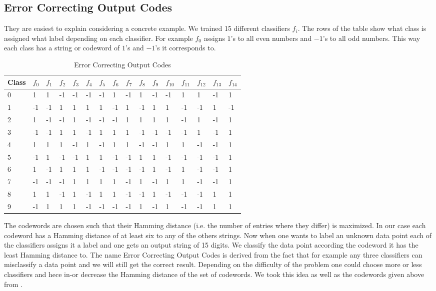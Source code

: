 \subsection{Error Correcting Output Codes}
They are easiest to explain considering a concrete example. We trained 15 different classifiers $f_i$. The rows of the table show what class is assigned what label depending on each classifier. For example $f_0$ assigns $1$'s to all even numbers and $-1$'s to all odd numbers. This way each class has a string or codeword of $1$'s and $-1$'s it corresponds to.

\begin{table}[ht!]
	\centering
	\caption{Error Correcting Output Codes}
	\label{Codewords}
	\begin{tabular}{|l|l|l|l|l|l|l|l|l|l|l|l|l|l|l|l|}
		\hline
		Class	& $f_0$ & $f_1$ & $f_2$ & $f_3$ & $f_4$ & $f_5$ & $f_6$ & $f_7$ & $f_8$ & $f_9$ & $f_{10}$ & $f_{11}$ & $f_{12}$ & $f_{13}$ & $f_{14}$ \\ \hline \hline
		0	& 1 & 1 & -1 & -1 & -1 & -1 & 1 & -1 & 1 & -1 & -1 & 1 & 1 & -1 & 1 \\ \hline
		1	& -1 & -1 & 1 & 1 & 1 & 1 & -1 & 1 & -1 & 1 & 1 & -1 & -1 & 1 & -1 \\ \hline
		2	& 1 & -1 & -1 & 1 & -1 & -1 & -1 & 1 & 1 & 1 & 1 & -1 & 1 & -1 & 1 \\ \hline
		3	& -1 & -1 & 1 & 1 & -1 & 1 & 1 & 1 & -1 & -1 & -1 & -1 & 1 & -1 & 1 \\ \hline
		4	& 1 & 1 & 1 & -1 & 1 & -1 & 1 & 1 & -1 & -1 & 1 & 1 & -1 & -1 & 1 \\ \hline
		5	& -1 & 1 & -1 & -1 & 1 & 1 & -1 & -1 & 1 & 1 & -1 & -1 & -1 & -1 & 1 \\ \hline
		6	& 1 & -1 & 1 & 1 & 1 & -1 & -1 & -1 & -1 & 1 & -1 & 1 & -1 & -1 & 1 \\ \hline
		7	& -1 & -1 & -1 & 1 & 1 & 1 & 1 & -1 & 1 & -1 & 1 & 1 & -1 & -1 & 1 \\ \hline
		8	& 1 & 1 & -1 & 1 & -1 & 1 & 1 & -1 & -1 & 1 & -1 & -1 & -1 & 1 & 1 \\ \hline
		9	& -1 & 1 & 1 & 1 & -1 & -1 & -1 & -1 & 1 & -1 & 1 & -1 & -1 & 1 & 1 \\ \hline
	\end{tabular}
\end{table}  

The codewords are chosen such that their Hamming distance (i.e. the number of entries where they differ) is maximized. In our case each codeword has a Hamming distance of at least six to any of the others strings. Now when one wants to label an unknown data point each of the classifiers assigns it a label and one gets an output string of 15 digits. We classify the data point according the codeword it has the least Hamming distance to. The name Error Correcting Output Codes is derived from the fact that for example any three classifiers can misclassify a data point and we will still get the correct result. Depending on the difficulty of the problem one could choose more or less classifiers and hece in-or decrease the Hamming distance of the set of codewords. We took this idea as well as the codewords given above from \cite{dietterich1995solving}.


